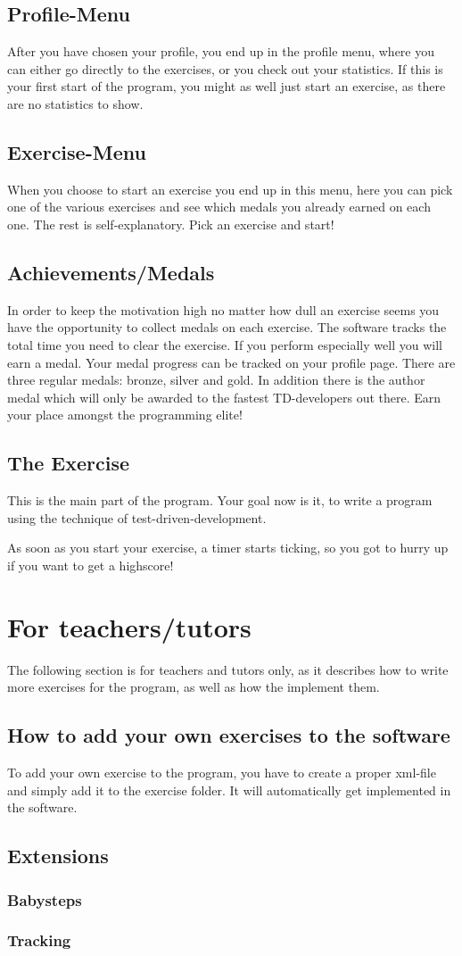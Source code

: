 \documentclass[10pt,a4paper]{article}
\begin{document}
\subsection{Profile-Menu}
After you have chosen your profile, you end up in the profile menu, where you can either go directly to the exercises, or you check out your statistics. If this is your first start of the program, you might as well just start an exercise, as there are no statistics to show.
\subsection{Exercise-Menu}
When you choose to start an exercise you end up in this menu, here you can pick one of the various exercises and see which medals you already earned on each one.
The rest is self-explanatory. Pick an exercise and start!
\subsection{Achievements/Medals}
In order to keep the motivation high no matter how dull an exercise seems you have the opportunity to collect medals on each exercise. The software tracks the total time you need to clear the exercise. If you perform especially well you will earn
a medal. Your medal progress can be tracked on your profile page.
There are three regular medals: bronze, silver and gold. In addition there is the author medal which will only be awarded to the fastest TD-developers out there.
Earn your place amongst the programming elite!
\subsection{The Exercise}
This is the main part of the program. Your goal now is it, to write a program using the technique of test-driven-development.

As soon as you start your exercise, a timer starts ticking, so you got to hurry up if you want to get a highscore! 
\section{For teachers/tutors}
The following section is for teachers and tutors only, as it describes how to write more exercises for the program, as well as how the implement them.
\subsection{How to add your own exercises to the software}
To add your own exercise to the program, you have to create a proper xml-file and simply add it to the exercise folder. It will automatically get implemented in the software.
\subsection{Extensions}

\subsubsection{Babysteps}

\subsubsection{Tracking}
\end{document}
